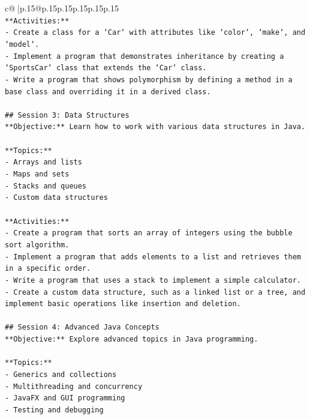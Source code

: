 \documentclass{article}
\begin{document}
{\begin{supertabular}{c@{$\;$}|p{.15\linewidth}@{}p{.15\linewidth}p{.15\linewidth}p{.15\linewidth}p{.15\linewidth}p{.15\linewidth}}
{{{\\ 
\texttt{**Activities:**} \\
\texttt{{-} Create a class for a `Car` with attributes like `color`, `make`, and `model`.} \\
\texttt{{-} Implement a program that demonstrates inheritance by creating a `SportsCar` class that extends the `Car` class.} \\
\texttt{{-} Write a program that shows polymorphism by defining a method in a base class and overriding it in a derived class.} \\
\\ 
\texttt{\#\# Session 3: Data Structures} \\
\texttt{**Objective:** Learn how to work with various data structures in Java.} \\
\\ 
\texttt{**Topics:**} \\
\texttt{{-} Arrays and lists} \\
\texttt{{-} Maps and sets} \\
\texttt{{-} Stacks and queues} \\
\texttt{{-} Custom data structures} \\
\\ 
\texttt{**Activities:**} \\
\texttt{{-} Create a program that sorts an array of integers using the bubble sort algorithm.} \\
\texttt{{-} Implement a program that adds elements to a list and retrieves them in a specific order.} \\
\texttt{{-} Write a program that uses a stack to implement a simple calculator.} \\
\texttt{{-} Create a custom data structure, such as a linked list or a tree, and implement basic operations like insertion and deletion.} \\
\\ 
\texttt{\#\# Session 4: Advanced Java Concepts} \\
\texttt{**Objective:** Explore advanced topics in Java programming.} \\
\\ 
\texttt{**Topics:**} \\
\texttt{{-} Generics and collections} \\
\texttt{{-} Multithreading and concurrency} \\
\texttt{{-} JavaFX and GUI programming} \\
\texttt{{-} Testing and debugging} \\
}}}
\end{supertabular}}
\end{document}
